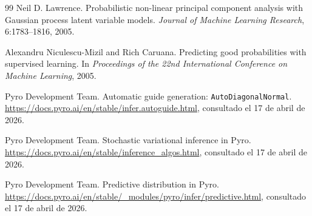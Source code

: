 \documentclass{article}
\begin{document}
\begin{thebibliography}{99}
    Neil D. Lawrence.
    \newblock Probabilistic non-linear principal component analysis with Gaussian process latent variable models.
    \newblock \emph{Journal of Machine Learning Research}, 6:1783--1816, 2005.

    Alexandru Niculescu-Mizil and Rich Caruana.
    \newblock Predicting good probabilities with supervised learning.
    \newblock In \emph{Proceedings of the 22nd International Conference on Machine Learning}, 2005.

    Pyro Development Team.
    \newblock Automatic guide generation: \texttt{AutoDiagonalNormal}.
    \newblock \url{https://docs.pyro.ai/en/stable/infer.autoguide.html}, consultado el 17 de abril de 2026.

    Pyro Development Team.
    \newblock Stochastic variational inference in Pyro.
    \newblock \url{https://docs.pyro.ai/en/stable/inference_algos.html}, consultado el 17 de abril de 2026.

    Pyro Development Team.
    \newblock Predictive distribution in Pyro.
    \newblock \url{https://docs.pyro.ai/en/stable/_modules/pyro/infer/predictive.html}, consultado el 17 de abril de 2026.

\end{thebibliography}

\newpage
\end{document}
